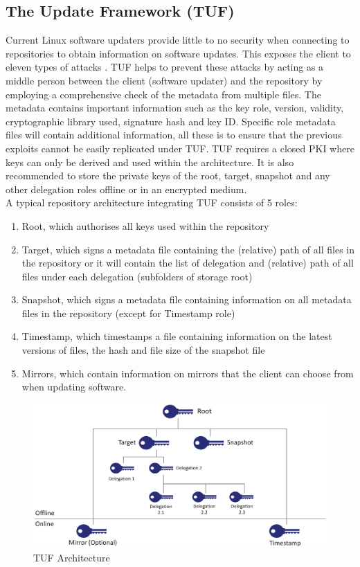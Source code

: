 \documentclass[a4paper,12pt]{article}
\begin{document}
{	\subsection{The Update Framework (TUF)}
	{\par
		Current Linux software updaters provide little to no security when connecting to repositories to obtain information on software updates. This exposes the client to eleven types of attacks \cite{PkgMgmtSec,ProtectCommunityRepo,KeyCompromiseSoftwareUpdater,DCTDocker}. \ac{TUF} helps to prevent these attacks by acting as a middle person between the client (software updater) and the repository by employing a comprehensive check of the metadata from multiple files. The metadata contains important information such as the key role, version, validity, cryptographic library used, signature hash and key ID. Specific role metadata files will contain additional information, all these is to ensure that the previous exploits cannot be easily replicated under \ac{TUF}. \ac{TUF} requires a closed \ac{PKI} where keys can only be derived and used within the architecture. It is also recommended to store the private keys of the root, target, snapshot and any other delegation roles offline or in an encrypted medium.
		\\
		\newline
		A typical repository architecture integrating \ac{TUF} consists of 5 roles:
		\begin{enumerate}\setlength\itemsep{0pt}
			\item Root, which authorises all keys used within the repository
			\item Target, which signs a metadata file containing the (relative) path of all files in the repository or it will contain the list of delegation and (relative) path of all files under each delegation (subfolders of storage root)
			\item Snapshot, which signs a metadata file containing information on all metadata files in the repository (except for Timestamp role)
			\item Timestamp, which timestamps a file containing information on the latest versions of files, the hash and file size of the snapshot file
			\item Mirrors, which contain information on mirrors that the client can choose from when updating software.
		\end{enumerate}
	}
	
	\begin{figure}[H]
		\centering
		\includegraphics[width=0.7\linewidth]{TUFarc}
		\caption[TUF Architecture]{\ac{TUF} Architecture}
		\label{fig:tufarc}
	\end{figure}
}
\end{document}
